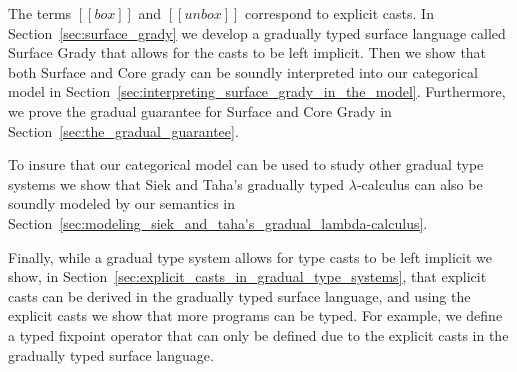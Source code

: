 The terms $[[box]]$ and $[[unbox]]$ correspond to explicit casts.  In
Section~\ref{sec:surface_grady} we develop a gradually typed surface
language called Surface Grady that allows for the casts to be left
implicit.  Then we show that both Surface and Core grady can be
soundly interpreted into our categorical model in
Section~\ref{sec:interpreting_surface_grady_in_the_model}.
Furthermore, we prove the gradual guarantee for Surface and Core Grady
in Section~\ref{sec:the_gradual_guarantee}.

To insure that our categorical model can be used to study other
gradual type systems we show that Siek and Taha's gradually typed
$\lambda$-calculus \cite{Siek:2006,Siek:2015} can also be soundly
modeled by our semantics in
Section~\ref{sec:modeling_siek_and_taha's_gradual_lambda-calculus}.

Finally, while a gradual type system allows for type casts to be left
implicit we show, in
Section~\ref{sec:explicit_casts_in_gradual_type_systems}, that
explicit casts can be derived in the gradually typed surface language,
and using the explicit casts we show that more programs can be typed.
For example, we define a typed fixpoint operator that can only be
defined due to the explicit casts in the gradually typed surface
language.

